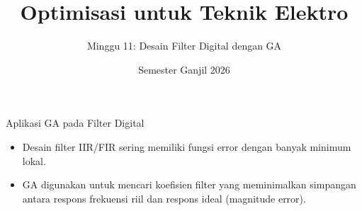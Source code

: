 \documentclass[aspectratio=169]{beamer}
\title{Optimisasi untuk Teknik Elektro}\subtitle{Minggu 11: Desain Filter Digital dengan GA}
\date{Semester Ganjil 2026}
\begin{document}
\begin{frame}\titlepage\end{frame}
\begin{frame}{Aplikasi GA pada Filter Digital}
\begin{itemize}
\item Desain filter IIR/FIR sering memiliki fungsi error dengan banyak minimum lokal.
\item GA digunakan untuk mencari koefisien filter yang meminimalkan simpangan antara respons frekuensi riil dan respons ideal (magnitude error).
\end{itemize}
\end{frame}
\end{document}
